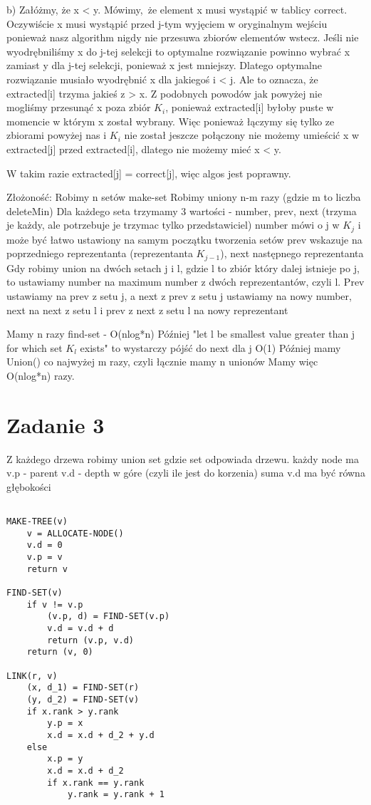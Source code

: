 \documentclass[12pt]{article}
\begin{document}
b) Załóżmy, że x < y. Mówimy, że element x musi wystąpić w tablicy correct. Oczywiście x musi wystąpić przed j-tym wyjęciem w oryginalnym wejściu ponieważ nasz algorithm nigdy nie przesuwa zbiorów elementów wstecz. Jeśli nie wyodrębniliśmy x do j-tej selekcji to optymalne rozwiązanie powinno wybrać x zamiast y dla j-tej selekcji, ponieważ x jest mniejszy. Dlatego optymalne rozwiązanie musiało wyodrębnić x dla jakiegoś i < j. Ale to oznacza, że extracted[i] trzyma jakieś z > x. Z podobnych powodów jak powyżej nie mogliśmy przesunąć x poza zbiór $K_i$, ponieważ extracted[i] byłoby puste w momencie w którym x został wybrany. Więc ponieważ łączymy się tylko ze zbiorami powyżej nas i $K_i$ nie został jeszcze połączony nie możemy umieścić x w extracted[j] przed extracted[i], dlatego nie możemy mieć x < y.

W takim razie extracted[j] = correct[j], więc algos jest poprawny.


Złożoność:
Robimy n setów make-set 
Robimy uniony n-m razy (gdzie m to liczba deleteMin)
Dla każdego seta trzymamy 3 wartości - number, prev, next (trzyma je każdy, ale potrzebuje je trzymac tylko przedstawiciel)
number mówi o j w $K_j$ i może być łatwo ustawiony na samym początku tworzenia setów
prev wskazuje na poprzedniego reprezentanta (reprezentanta $K_{j-1}$), next następnego reprezentanta
Gdy robimy union na dwóch setach j i l, gdzie l to zbiór który dalej istnieje po j, to ustawiamy number na maximum number z dwóch reprezentantów, czyli l. Prev ustawiamy na prev z setu j, a next z prev z setu j ustawiamy na nowy number, next na next z setu l i prev z next z setu l na nowy reprezentant

Mamy n razy find-set - O(nlog*n)
Później "let l be smallest value greater than j for which set $K_l$ exists" to wystarczy pójść do next dla j O(1)
Później mamy Union() co najwyżej m razy, czyli łącznie mamy n unionów
Mamy więc O(nlog*n) razy.



\section{Zadanie 3}
Z każdego drzewa robimy union set gdzie set odpowiada drzewu. 
każdy node ma v.p - parent v.d - depth w góre (czyli ile jest do korzenia)
suma v.d ma być równa głębokości

\begin{lstlisting}
    
MAKE-TREE(v)
    v = ALLOCATE-NODE()
    v.d = 0
    v.p = v
    return v

FIND-SET(v)
    if v != v.p
        (v.p, d) = FIND-SET(v.p)
        v.d = v.d + d
        return (v.p, v.d)
    return (v, 0)

LINK(r, v)
    (x, d_1) = FIND-SET(r)
    (y, d_2) = FIND-SET(v)
    if x.rank > y.rank
        y.p = x
        x.d = x.d + d_2 + y.d
    else
        x.p = y
        x.d = x.d + d_2
        if x.rank == y.rank
            y.rank = y.rank + 1

\end{lstlisting}
\end{document}
